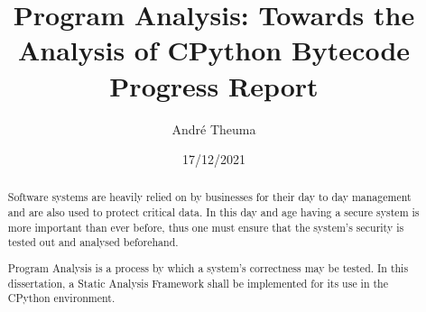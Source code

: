 \documentclass[12pt, a4paper]{report}
\theoremstyle{definition}
\theoremstyle{definition}%
\theoremstyle{definition}%
\theoremstyle{definition}%
\theoremstyle{definition}%
\theoremstyle{definition}%
\begin{document}
\title{Program Analysis: Towards the Analysis of CPython Bytecode
    \large{Progress Report}
}
\author{André Theuma}
\date{17/12/2021}

\frontmatterprogreport

\begin{abstract}
    \par Software systems are heavily relied on by businesses for their day to day management and are also used to protect critical data.
    In this day and age having a secure system is more important than ever before, thus one must ensure that the system's security is tested out and analysed beforehand.
    \par Program Analysis is a process by which a system's correctness may be tested. In this dissertation, a Static Analysis Framework shall be implemented for its use in the
    CPython environment.

\end{abstract}

\tableofcontents





\mainmatter
\end{document}
